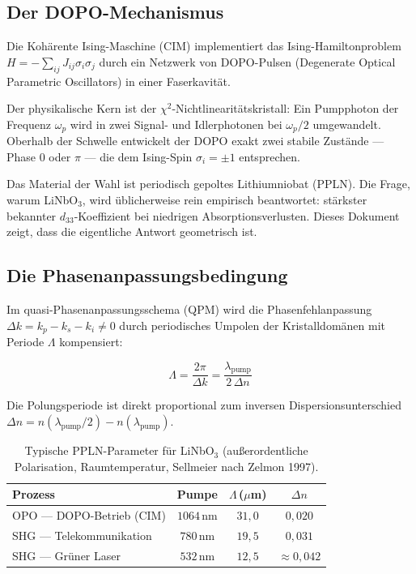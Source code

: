 \subsection{Der DOPO-Mechanismus}

Die Kohärente Ising-Maschine (CIM) implementiert das Ising-Hamiltonproblem
$H = -\sum_{ij} J_{ij}\sigma_i\sigma_j$ durch ein Netzwerk von DOPO-Pulsen
(Degenerate Optical Parametric Oscillators) in einer Faserkavität.

Der physikalische Kern ist der $\chi^2$-Nichtlinearitätskristall: Ein Pumpphoton
der Frequenz $\omega_p$ wird in zwei Signal- und Idlerphotonen bei $\omega_p/2$
umgewandelt. Oberhalb der Schwelle entwickelt der DOPO exakt zwei stabile
Zustände — Phase 0 oder $\pi$ — die dem Ising-Spin $\sigma_i = \pm 1$
entsprechen.

Das Material der Wahl ist periodisch gepoltes Lithiumniobat (PPLN). Die Frage,
warum LiNbO$_3$, wird üblicherweise rein empirisch beantwortet: stärkster
bekannter $d_{33}$-Koeffizient bei niedrigen Absorptionsverlusten.
Dieses Dokument zeigt, dass die eigentliche Antwort geometrisch ist.

\subsection{Die Phasenanpassungsbedingung}

Im quasi-Phasenanpassungsschema (QPM) wird die Phasenfehlanpassung
$\Delta k = k_p - k_s - k_i \neq 0$ durch periodisches Umpolen der
Kristalldomänen mit Periode $\Lambda$ kompensiert:

\begin{equation}
    \Lambda = \frac{2\pi}{\Delta k} = \frac{\lambda_{\text{pump}}}{2\,\Delta n}
    \label{eq:poling}
\end{equation}

Die Polungsperiode ist direkt proportional zum inversen
Dispersionsunterschied $\Delta n = n(\lambda_{\text{pump}}/2) -
n(\lambda_{\text{pump}})$.

\begin{table}[H]
    \centering
    \begin{tabular}{lccc}
        \toprule
        \textbf{Prozess} & \textbf{Pumpe} &
        \textbf{$\Lambda$\,($\mu$m)} & \textbf{$\Delta n$} \\
        \midrule
        OPO — DOPO-Betrieb (CIM)  & $1064\,\text{nm}$ & $31{,}0$ & $0{,}020$ \\
        SHG — Telekommunikation   & $780\,\text{nm}$  & $19{,}5$ & $0{,}031$ \\
        SHG — Grüner Laser        & $532\,\text{nm}$  & $12{,}5$ & $\approx 0{,}042$ \\
        \bottomrule
    \end{tabular}
    \caption{Typische PPLN-Parameter für LiNbO$_3$ (außerordentliche
    Polarisation, Raumtemperatur, Sellmeier nach Zelmon 1997).}
    \label{tab:ppln}
\end{table}

